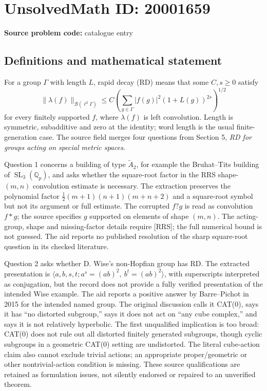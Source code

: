 \documentclass[11pt]{article}
\newcommand{\Q}{\mathbb{Q}}
\begin{document}
\section*{UnsolvedMath ID: 20001659}
\textbf{Source problem code:} catalogue entry
\subsection{Definitions and mathematical statement}
For a group \(\Gamma\) with length \(L\), rapid decay (RD) means that some \(C,s\ge0\) satisfy
\[
\|\lambda(f)\|_{\mathcal B(\ell^2\Gamma)}\le C\left(\sum_{g\in\Gamma}|f(g)|^2(1+L(g))^{2s}\right)^{1/2}
\]
for every finitely supported \(f\), where \(\lambda(f)\) is left convolution. Length is symmetric, subadditive and zero at the identity; word length is the usual finite-generation case. The source field merges four questions from Section 5, \emph{RD for groups acting on special metric spaces}.

Question 1 concerns a building of type \(\widetilde A_2\), for example the Bruhat--Tits building of \(\operatorname{SL}_3(\Q_p)\), and asks whether the square-root factor in the RRS shape-\((m,n)\) convolution estimate is necessary. The extraction preserves the polynomial factor \(\tfrac12(m+1)(n+1)(m+n+2)\) and a square-root symbol but not its argument or full estimate. The corrupted \(f?g\) is read as convolution \(f*g\); the source specifies \(g\) supported on elements of shape \((m,n)\). The acting-group, shape and missing-factor details require [RRS]; the full numerical bound is not guessed. The aid reports no published resolution of the sharp square-root question in its checked literature.

Question 2 asks whether D. Wise's non-Hopfian group has RD. The extracted presentation is \(\langle a,b,s,t; a^s=(ab)^2,\ b^t=(ab)^2\rangle\), with superscripts interpreted as conjugation, but the record does not provide a fully verified presentation of the intended Wise example. The aid reports a positive answer by Barre--Pichot in 2015 for the intended named group. The original discussion calls it CAT(0), says it has ``no distorted subgroup,'' says it does not act on ``any cube complex,'' and says it is not relatively hyperbolic. The first unqualified implication is too broad: CAT(0) does not rule out all distorted finitely generated subgroups, though cyclic subgroups in a geometric CAT(0) setting are undistorted. The literal cube-action claim also cannot exclude trivial actions; an appropriate proper/geometric or other nontrivial-action condition is missing. These source qualifications are retained as formulation issues, not silently endorsed or repaired to an unverified theorem.
\end{document}

